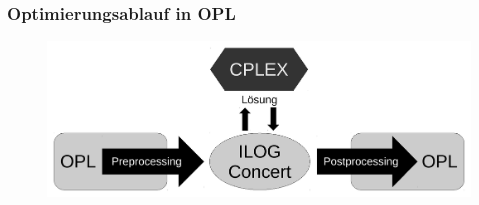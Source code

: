 \begin{frame}
 \frametitle{Optimierungsablauf in OPL}
 \begin{figure}
   \centering
   \includegraphics[width=\linewidth]{Bilder/OPL-Ablauf}
 \end{figure}
\end{frame}

